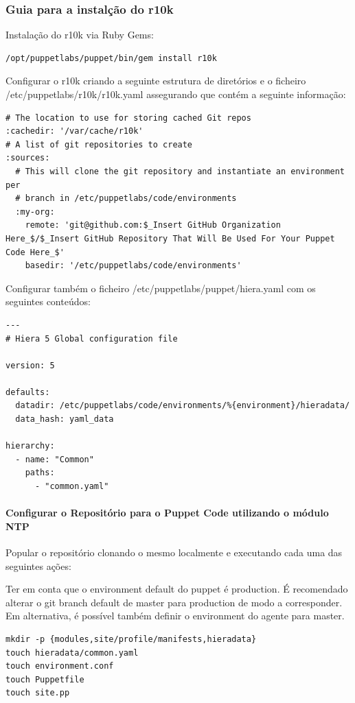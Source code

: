 \documentclass{article}
\begin{document}
\subsubsection{Guia para a instalção do r10k}

Instalação do r10k via Ruby Gems:

\begin{lstlisting}
/opt/puppetlabs/puppet/bin/gem install r10k
\end{lstlisting}

Configurar o r10k criando a seguinte estrutura de diretórios e o ficheiro /etc/puppetlabs/r10k/r10k.yaml assegurando que contém a seguinte informação:
\begin{lstlisting}
# The location to use for storing cached Git repos
:cachedir: '/var/cache/r10k'
# A list of git repositories to create
:sources:
  # This will clone the git repository and instantiate an environment per
  # branch in /etc/puppetlabs/code/environments
  :my-org:
    remote: 'git@github.com:$_Insert GitHub Organization Here_$/$_Insert GitHub Repository That Will Be Used For Your Puppet Code Here_$'
    basedir: '/etc/puppetlabs/code/environments'
\end{lstlisting}

Configurar também o ficheiro /etc/puppetlabs/puppet/hiera.yaml com os seguintes conteúdos:

\begin{lstlisting}
---
# Hiera 5 Global configuration file

version: 5

defaults:
  datadir: /etc/puppetlabs/code/environments/%{environment}/hieradata/
  data_hash: yaml_data

hierarchy:
  - name: "Common"
    paths:
      - "common.yaml"
\end{lstlisting}

\paragraph{Configurar o Repositório para o Puppet Code utilizando o módulo NTP}
Popular o repositório clonando o mesmo localmente e executando cada uma das seguintes ações:

Ter em conta que o environment default do puppet é production. É recomendado alterar o git branch default de master para production de modo a corresponder. Em alternativa, é possível também definir o environment do agente para master.

\begin{lstlisting}
mkdir -p {modules,site/profile/manifests,hieradata}
touch hieradata/common.yaml
touch environment.conf
touch Puppetfile
touch site.pp
\end{lstlisting}
\end{document}
